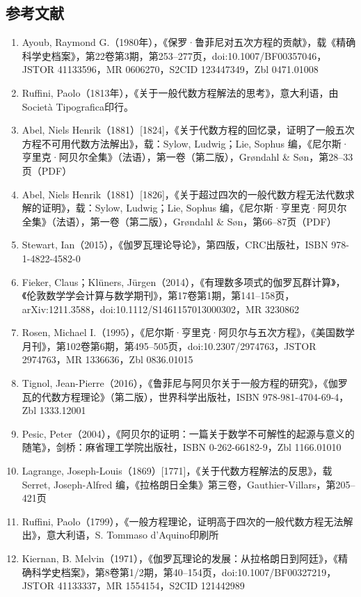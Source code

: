 \subsection{参考文献}
\begin{enumerate}
\item Ayoub, Raymond G.（1980年），《保罗·鲁菲尼对五次方程的贡献》，载《精确科学史档案》，第22卷第3期，第253–277页，doi:10.1007/BF00357046，JSTOR 41133596，MR 0606270，S2CID 123447349，Zbl 0471.01008
\item Ruffini, Paolo（1813年），《关于一般代数方程解法的思考》，意大利语，由Società Tipografica印行。
\item Abel, Niels Henrik（1881）[1824]，《关于代数方程的回忆录，证明了一般五次方程不可用代数方法解出》，载：Sylow, Ludwig；Lie, Sophus 编，《尼尔斯·亨里克·阿贝尔全集》（法语），第一卷（第二版），Grøndahl & Søn，第28–33页（PDF）
\item Abel, Niels Henrik（1881）[1826]，《关于超过四次的一般代数方程无法代数求解的证明》，载：Sylow, Ludwig；Lie, Sophus 编，《尼尔斯·亨里克·阿贝尔全集》（法语），第一卷（第二版），Grøndahl & Søn，第66–87页（PDF）
\item Stewart, Ian（2015），《伽罗瓦理论导论》，第四版，CRC出版社，ISBN 978-1-4822-4582-0
\item Fieker, Claus；Klüners, Jürgen（2014），《有理数多项式的伽罗瓦群计算》，《伦敦数学学会计算与数学期刊》，第17卷第1期，第141–158页，arXiv:1211.3588，doi:10.1112/S1461157013000302，MR 3230862
\item Rosen, Michael I.（1995），《尼尔斯·亨里克·阿贝尔与五次方程》，《美国数学月刊》，第102卷第6期，第495–505页，doi:10.2307/2974763，JSTOR 2974763，MR 1336636，Zbl 0836.01015
\item Tignol, Jean-Pierre（2016），《鲁菲尼与阿贝尔关于一般方程的研究》，《伽罗瓦的代数方程理论》（第二版），世界科学出版社，ISBN 978-981-4704-69-4，Zbl 1333.12001
\item Pesic, Peter（2004），《阿贝尔的证明：一篇关于数学不可解性的起源与意义的随笔》，剑桥：麻省理工学院出版社，ISBN 0-262-66182-9，Zbl 1166.01010
\item Lagrange, Joseph-Louis（1869）[1771]，《关于代数方程解法的反思》，载 Serret, Joseph-Alfred 编，《拉格朗日全集》第三卷，Gauthier-Villars，第205–421页
\item Ruffini, Paolo（1799），《一般方程理论，证明高于四次的一般代数方程无法解出》，意大利语，S. Tommaso d'Aquino印刷所
\item Kiernan, B. Melvin（1971），《伽罗瓦理论的发展：从拉格朗日到阿廷》，《精确科学史档案》，第8卷第1/2期，第40–154页，doi:10.1007/BF00327219，JSTOR 41133337，MR 1554154，S2CID 121442989

\end{enumerate}
